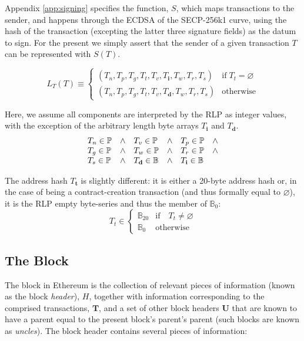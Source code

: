 \documentclass[9pt,oneside]{amsart}
\begin{document}
\begin{multicols}{2}
Appendix \ref{app:signing} specifies the function, $S$, which maps transactions to the sender, and happens through the ECDSA of the SECP-256k1 curve, using the hash of the transaction (excepting the latter three signature fields) as the datum to sign. For the present we simply assert that the sender of a given transaction $T$ can be represented with $S(T)$.

\begin{equation}
L_T(T) \equiv \begin{cases}
(T_n, T_p, T_g, T_t, T_v, T_\mathbf{i}, T_w, T_r, T_s) & \text{if} \; T_t = \varnothing\\
(T_n, T_p, T_g, T_t, T_v, T_\mathbf{d}, T_w, T_r, T_s) & \text{otherwise} 
\end{cases}
\end{equation}

Here, we assume all components are interpreted by the RLP as integer values, with the exception of the arbitrary length byte arrays $T_\mathbf{i}$ and $T_\mathbf{d}$.
\begin{equation}
\begin{array}[t]{lclclc}
T_n \in \mathbb{P} & \wedge & T_v \in \mathbb{P} & \wedge & T_p \in \mathbb{P} & \wedge \\
T_g \in \mathbb{P} & \wedge & T_w \in \mathbb{P} & \wedge & T_r \in \mathbb{P} & \wedge \\
T_s \in \mathbb{P} & \wedge & T_\mathbf{d} \in \mathbb{B} & \wedge & T_\mathbf{i} \in \mathbb{B}
\end{array}
\end{equation}

The address hash $T_\mathbf{t}$ is slightly different: it is either a 20-byte address hash or, in the case of being a contract-creation transaction (and thus formally equal to $\varnothing$), it is the RLP empty byte-series and thus the member of $\mathbb{B}_0$:
\begin{equation}
T_t \in \begin{cases} \mathbb{B}_{20} & \text{if} \quad T_t \neq \varnothing \\
\mathbb{B}_{0} & \text{otherwise}\end{cases}
\end{equation}

\subsection{The Block} \label{ch:block}

The block in Ethereum is the collection of relevant pieces of information (known as the block \textit{header}), $H$, together with information corresponding to the comprised transactions, $\mathbf{T}$, and a set of other block headers $\mathbf{U}$ that are known to have a parent equal to the present block's parent's parent (such blocks are known as \textit{uncles}). The block header contains several pieces of information:


\end{multicols}
\end{document}
